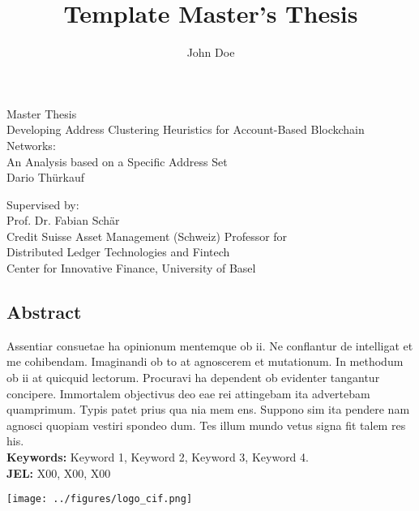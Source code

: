 \documentclass[12pt,a4paper,titlepage,oneside,english]{article}
\title{Template Master's Thesis}
\author{John Doe}
\begin{document}
\begin{center}
\vspace{1em}
\large{Master Thesis}\\
\huge Developing Address Clustering Heuristics for Account-Based Blockchain Networks:\\ An Analysis based on a Specific Address Set \\
\Large \vspace{1em}
Dario Thürkauf
\end{center}

\vspace{1em}
\normalsize
\begin{flushleft}
Supervised by:\\ 
Prof. Dr. Fabian Schär \\
Credit Suisse Asset Management (Schweiz) Professor for \\ 
Distributed Ledger Technologies and Fintech \\
Center for Innovative Finance, University of Basel
\end{flushleft}

\vspace{1em}
\onehalfspacing
\begin{center}
\section*{Abstract}
\end{center}
Assentiar consuetae ha opinionum mentemque ob ii. Ne conflantur de intelligat et me cohibendam. Imaginandi ob to at agnoscerem et mutationum. In methodum ob ii at quicquid lectorum. Procuravi ha dependent ob evidenter tangantur concipere. Immortalem objectivus deo eae rei attingebam ita advertebam quamprimum. Typis patet prius qua nia mem ens. Suppono sim ita pendere nam agnosci quopiam vestiri spondeo dum. Tes illum mundo vetus signa fit talem res his.  \\
\vfill
\textbf{Keywords:} Keyword 1, Keyword 2, Keyword 3, Keyword 4.\\
\noindent\textbf{JEL:} X00, X00, X00




\newpage
{}
\tableofcontents

\vfill
\begin{center}
\texttt{[image: ../figures/logo\_cif.png]}
\end{center}
\newpage
\singlespacing
\end{document}
